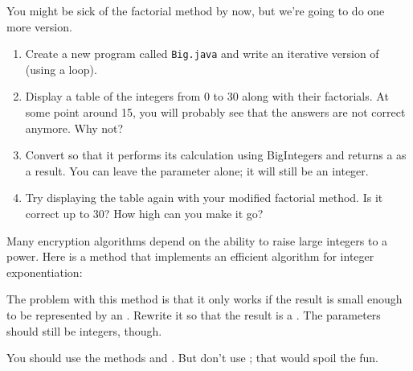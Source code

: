 \begin{exercise}  %


You might be sick of the factorial method by now, but we're going to do one more version.

\begin{enumerate}

\item Create a new program called {\tt Big.java} and write an iterative version of  (using a  loop).

\item Display a table of the integers from 0 to 30 along with their factorials.
At some point around 15, you will probably see that the answers are not correct anymore.
Why not?

\item Convert  so that it performs its calculation using BigIntegers and returns a  as a result.
You can leave the parameter alone; it will still be an integer.

\item Try displaying the table again with your modified factorial method.
Is it correct up to 30?
How high can you make it go?

\end{enumerate}

\end{exercise}


\begin{exercise}  %

Many encryption algorithms depend on the ability to raise large integers to a power.
Here is a method that implements an efficient algorithm for integer exponentiation:


The problem with this method is that it only works if the result is small enough to be represented by an .
Rewrite it so that the result is a .
The parameters should still be integers, though.

You should use the  methods  and .
But don't use ; that would spoil the fun.

\end{exercise}


